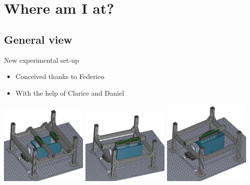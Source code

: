 \documentclass[utf8]{beamer} \usetheme{lfcr} %
\begin{document}
%
\section{Where am I at?}
\subsection{General view}
\begin{frame}{New experimental set-up}

  \begin{itemize}
    \item Conceived thanks to Federico
    \item With the help of Clarice and Daniel
  \end{itemize}

  \begin{center}
    \includegraphics[width=0.32\textwidth]{Smallcombs_2.PNG}
    \includegraphics[width=0.32\textwidth]{Smallcombs_1.PNG}
    \includegraphics[width=0.32\textwidth]{Bigcomb.PNG}
  \end{center}
 
\end{frame}
%
\end{document}
